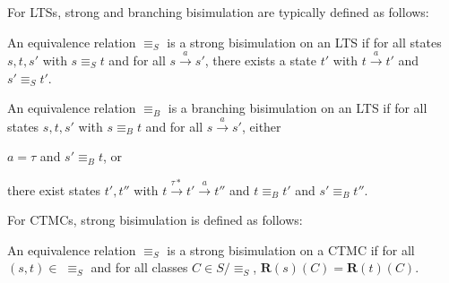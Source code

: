 \label{sec:bisim_lit}

\newcommand{\eqs}[0]{\ensuremath{\equiv_{S}}}
\newcommand{\eqb}[0]{\ensuremath{\equiv_{B}}}

%
%
%
%


For LTSs, strong and branching bisimulation are typically defined as follows:

\begin{definition}%
\label{def:stronglts}
An equivalence relation $\eqs$ is a strong bisimulation on an LTS if for all states $s,t,s'$ with $s\eqs t$ and for all $s\overset{a}\rightarrow s'$, there exists a state $t'$ with $t\overset{a}\rightarrow t'$ and $s'\eqs t'$.
\end{definition}

\begin{definition}%
\label{def:branchinglts}
An equivalence relation $\eqb$ is a branching bisimulation on an LTS if for all states $s,t,s'$ with $s\eqb t$ and for all $s\overset{a}\rightarrow s'$, either
\begin{compactitem}
\item $a=\tau$ and $s'\eqb t$, or
\item there exist states $t',t''$ with $t\overset{\tau*}\rightarrow t'\overset{a}\rightarrow t''$ and $t\eqb t'$ and $s'\eqb t''$.
\end{compactitem}
\end{definition}

For CTMCs, strong bisimulation is defined as follows:

\begin{definition}
\label{def:strongctmc}
An equivalence relation $\eqs$ is a strong bisimulation on a CTMC if for all $(s,t)\in\;\eqs$ and for all classes $C\in S/\!\eqs$, $\textbf{R}(s)(C)=\textbf{R}(t)(C)$.
\end{definition}

